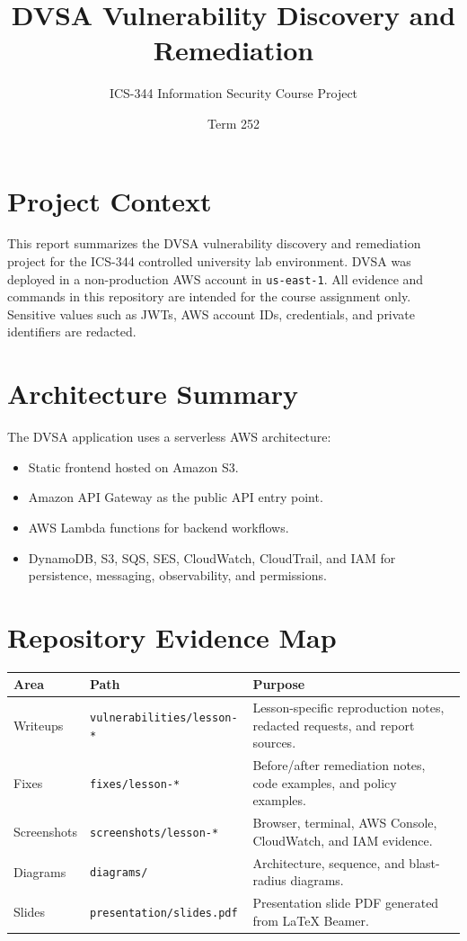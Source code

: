 \documentclass[12pt]{article}
\title{DVSA Vulnerability Discovery and Remediation}
\author{ICS-344 Information Security Course Project}
\date{Term 252}
\begin{document}
\maketitle

\section*{Project Context}

This report summarizes the DVSA vulnerability discovery and remediation project for the ICS-344 controlled university lab environment. DVSA was deployed in a non-production AWS account in \texttt{us-east-1}. All evidence and commands in this repository are intended for the course assignment only. Sensitive values such as JWTs, AWS account IDs, credentials, and private identifiers are redacted.

\section*{Architecture Summary}

The DVSA application uses a serverless AWS architecture:

\begin{itemize}
  \item Static frontend hosted on Amazon S3.
  \item Amazon API Gateway as the public API entry point.
  \item AWS Lambda functions for backend workflows.
  \item DynamoDB, S3, SQS, SES, CloudWatch, CloudTrail, and IAM for persistence, messaging, observability, and permissions.
\end{itemize}

\section*{Repository Evidence Map}

\begin{longtable}{p{}p{}p{}}
\toprule
Area & Path & Purpose \\
\midrule
Writeups & \texttt{vulnerabilities/lesson-*} & Lesson-specific reproduction notes, redacted requests, and report sources. \\
Fixes & \texttt{fixes/lesson-*} & Before/after remediation notes, code examples, and policy examples. \\
Screenshots & \texttt{screenshots/lesson-*} & Browser, terminal, AWS Console, CloudWatch, and IAM evidence. \\
Diagrams & \texttt{diagrams/} & Architecture, sequence, and blast-radius diagrams. \\
Slides & \texttt{presentation/slides.pdf} & Presentation slide PDF generated from LaTeX Beamer. \\
\bottomrule
\end{longtable}
\end{document}
